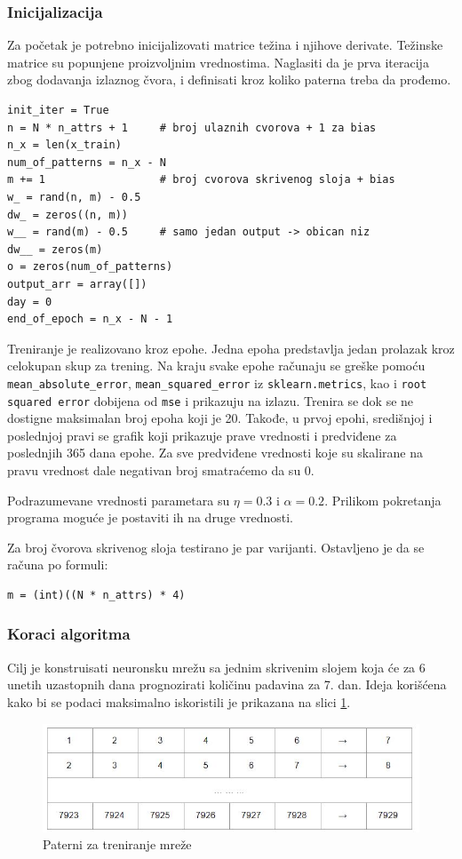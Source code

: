 \documentclass[a4paper]{article}
\begin{document}
\subsubsection{Inicijalizacija}
Za početak je potrebno inicijalizovati matrice težina i njihove derivate. Težinske matrice su popunjene proizvoljnim vrednostima. Naglasiti da je prva iteracija zbog dodavanja izlaznog čvora, i definisati kroz koliko paterna treba da prođemo. 
\begin{verbatim}
init_iter = True
n = N * n_attrs + 1     # broj ulaznih cvorova + 1 za bias
n_x = len(x_train)
num_of_patterns = n_x - N
m += 1                  # broj cvorova skrivenog sloja + bias
w_ = rand(n, m) - 0.5
dw_ = zeros((n, m))
w__ = rand(m) - 0.5     # samo jedan output -> obican niz
dw__ = zeros(m)
o = zeros(num_of_patterns)
output_arr = array([])
day = 0
end_of_epoch = n_x - N - 1
\end{verbatim}
Treniranje je realizovano kroz epohe. Jedna epoha predstavlja jedan prolazak kroz celokupan skup za trening. Na kraju svake epohe računaju se greške pomoću \texttt{mean\_absolute\_error}, \texttt{mean\_squared\_error} iz \texttt{sklearn.metrics}, kao i  \texttt{root squared error} dobijena od \texttt{mse} i prikazuju na izlazu. Trenira se dok se ne dostigne maksimalan broj epoha koji je 20. Takođe, u prvoj epohi, središnjoj i poslednjoj pravi se grafik koji prikazuje prave vrednosti i predviđene za poslednjih 365 dana epohe. Za sve predviđene vrednosti koje su skalirane na pravu vrednost dale negativan broj smatraćemo da su $0$.

Podrazumevane vrednosti parametara su $ \eta{} = 0.3$ i $\alpha{} = 0.2 $. Prilikom pokretanja programa moguće je postaviti ih na druge vrednosti.

Za broj čvorova skrivenog sloja testirano je par varijanti. Ostavljeno je da se računa po formuli:
\begin{verbatim}
m = (int)((N * n_attrs) * 4)
\end{verbatim}

\subsubsection{Koraci algoritma}
Cilj je konstruisati neuronsku mrežu sa jednim skrivenim slojem koja će za 6 unetih uzastopnih dana prognozirati količinu padavina za 7. dan. Ideja korišćena kako bi se podaci maksimalno iskoristili je prikazana na slici \ref{fig:dani}.

\begin{figure}[h]
\begin{center}
\includegraphics[scale=0.7]{dani.JPG}
\end{center}
\caption{Paterni za treniranje mreže}
\label{fig:dani}
\end{figure}
\end{document}
